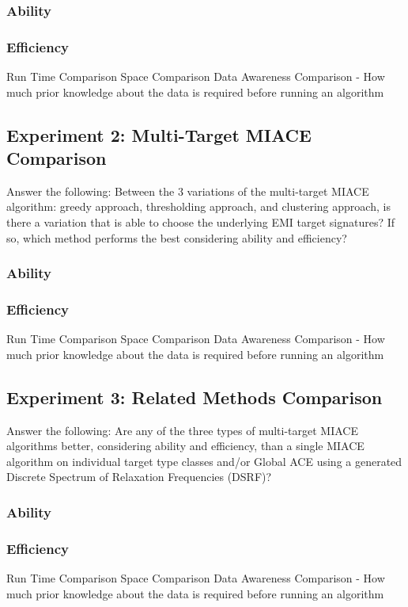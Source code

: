 \subsubsection{Ability}


\subsubsection{Efficiency}
Run Time Comparison \newline
Space Comparison \newline
Data Awareness Comparison - How much prior knowledge about the data is required before running an algorithm\newline


\subsection{Experiment 2: Multi-Target MIACE Comparison}
Answer the following: Between the 3 variations of the multi-target MIACE algorithm: greedy approach, thresholding approach, and clustering approach, is there a variation that is able to choose the underlying EMI target signatures? If so, which method performs the best considering ability and efficiency?

\subsubsection{Ability}

\subsubsection{Efficiency}
Run Time Comparison \newline
Space Comparison \newline
Data Awareness Comparison - How much prior knowledge about the data is required before running an algorithm\newline


\subsection{Experiment 3: Related Methods Comparison}
Answer the following: Are any of the three types of multi-target MIACE algorithms better, considering ability and efficiency, than a single MIACE algorithm on individual target type classes and/or Global ACE using a generated Discrete Spectrum of Relaxation Frequencies (DSRF)?

\subsubsection{Ability}

\subsubsection{Efficiency}
Run Time Comparison \newline
Space Comparison \newline
Data Awareness Comparison - How much prior knowledge about the data is required before running an algorithm\newline











